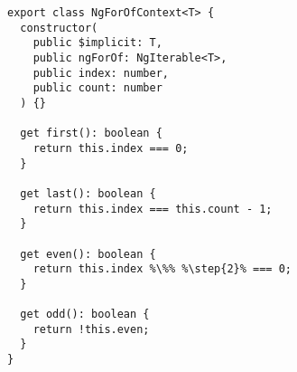 \begin{verbatim}
export class NgForOfContext<T> {
  constructor(
    public $implicit: T,
    public ngForOf: NgIterable<T>,
    public index: number,
    public count: number
  ) {}

  get first(): boolean {
    return this.index === 0;
  }

  get last(): boolean {
    return this.index === this.count - 1;
  }

  get even(): boolean {
    return this.index %\%% %\step{2}% === 0;
  }

  get odd(): boolean {
    return !this.even;
  }
}
\end{verbatim}
